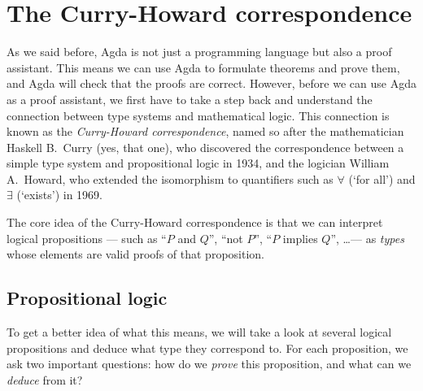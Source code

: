 \documentclass[a4paper,UKenglish]{tufte-handout}
\theoremstyle{definition}
\begin{document}
\section{The Curry-Howard correspondence}


As we said before, Agda is not just a programming language but
also a proof assistant. This means we can use Agda to formulate
theorems and prove them, and Agda will check that the proofs are
correct. However, before we can use Agda as a proof assistant, we
first have to take a step back and understand the connection between
type systems and mathematical logic. This connection is known as the
\emph{Curry-Howard correspondence}, named so after the mathematician
Haskell B.~Curry (yes, that one), who discovered the correspondence
between a simple type system and propositional logic in 1934, and the
logician William A.~Howard, who extended the isomorphism to
quantifiers such as $\forall$ (`for all') and $\exists$ (`exists') in
1969.

The core idea of the Curry-Howard correspondence is that we can
interpret logical propositions --- such as ``$P$ and $Q$'', ``not $P$'',
``$P$ implies $Q$'', \ldots --- as \emph{types} whose elements are valid
proofs of that proposition.

\subsection{Propositional logic}

To get a better idea of what this means, we will take a look at
several logical propositions and deduce what type they correspond
to. For each proposition, we ask two important questions: how do we
\emph{prove} this proposition, and what can we \emph{deduce} from it?
\end{document}
